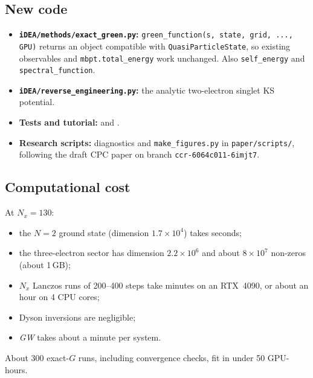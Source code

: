 \documentclass[11pt,a4paper]{article}
\newcommand{\GW}{\textit{GW}}
\newcommand{\code}[1]{\texttt{#1}}
\begin{document}
\subsection{New code}
\begin{itemize}
\item \textbf{\code{iDEA/\allowbreak methods/\allowbreak exact\_green.py}:} \code{green\_function(s, state, grid, ..., GPU)} returns an object compatible with \code{QuasiParticleState}, so existing observables and \code{mbpt.total\_energy} work unchanged. Also \code{self\_energy} and \code{spectral\_function}.
\item \textbf{\code{iDEA/reverse\_engineering.py}:} the analytic two-electron singlet KS potential.
\item \textbf{Tests and tutorial:}  and .
\item \textbf{Research scripts:} diagnostics and \code{make\_figures.py} in \code{paper/\allowbreak scripts/}, following the draft CPC paper on branch \code{ccr-\allowbreak 6064c011-\allowbreak 6imjt7}.
\end{itemize}

\subsection{Computational cost}
At $N_x=130$:
\begin{itemize}
\item the $N=2$ ground state (dimension $1.7\times10^4$) takes seconds;
\item the three-electron sector has dimension $2.2\times10^6$ and about $8\times10^7$ non-zeros (about 1\,GB);
\item $N_x$ Lanczos runs of 200--400 steps take minutes on an RTX~4090, or about an hour on 4 CPU cores;
\item Dyson inversions are negligible;
\item \GW{} takes about a minute per system.
\end{itemize}
About 300 exact-$G$ runs, including convergence checks, fit in under 50 GPU-hours.

\end{document}
